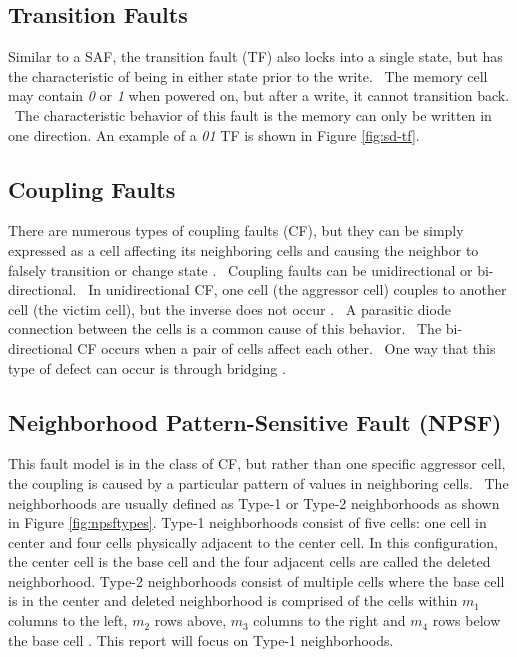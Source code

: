 \subsection{Transition Faults}
Similar to a SAF, the transition fault (TF) also locks into a single state, but has the characteristic of being in either state prior to the write.  The memory cell may contain \textit{0} or \textit{1} when powered on, but after a write, it cannot transition back.  The characteristic behavior of this fault is the memory can only be written in one direction.  An example of a \textit{01} TF is shown in Figure \ref{fig:sd-tf}.

\subsection{Coupling Faults}
There are numerous types of coupling faults (CF), but they can be simply expressed as a cell affecting its neighboring cells and causing the neighbor to falsely transition or change state \cite{VanDeGoor1991}.  Coupling faults can be unidirectional or bi-directional.  In unidirectional CF, one cell (the aggressor cell) couples to another cell (the victim cell), but the inverse does not occur \cite{Adams2003}.  A parasitic diode connection between the cells is a common cause of this behavior.  The bi-directional CF occurs when a pair of cells affect each other.  One way that this type of defect can occur is through bridging \cite{Adams2003}.  

\subsection{Neighborhood Pattern-Sensitive Fault (NPSF)}
\label{sec:npsf}
This fault model is in the class of CF, but rather than one specific aggressor cell, the coupling is caused by a particular pattern of values in neighboring cells.  The neighborhoods are usually defined as Type-1 or Type-2 neighborhoods \cite{1047051} as shown in Figure \ref{fig:npsftypes}.  Type-1 neighborhoods consist of five cells: one cell in center and four cells physically adjacent to the center cell.  In this configuration, the center cell is the base cell and the four adjacent cells are called the deleted neighborhood.  Type-2 neighborhoods consist of multiple cells where the base cell is in the center and deleted neighborhood is comprised of the cells within $m_1$ columns to the left, $m_2$ rows above, $m_3$ columns to the right and $m_4$ rows below the base cell \cite{VanDeGoor1991}.  This report will focus on Type-1 neighborhoods.

